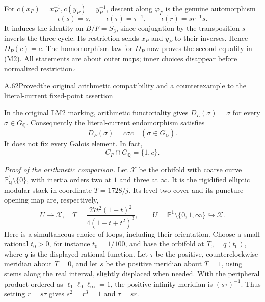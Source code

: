 For $c(x_P)=x_P^{-1},c(y_P)=y_P^{-1}$, descent along $\varphi_P$
is the genuine automorphism
\[
 \iota(s)=s,\qquad\iota(\tau)=\tau^{-1},\qquad
 \iota(r)=sr^{-1}s.
\]
It induces the identity on $B/F=S_3$, since conjugation by the
transposition $s$ inverts the three-cycle. Its restriction sends
$x_P$ and $y_P$ to their inverses. Hence $D_P(c)=c$.
The homomorphism law for $D_P$ now proves the second equality in (M2).
All statements are about outer maps; inner choices disappear before
normalized restriction.\hfill$\square$

\begin{statement}{A.62}{Proved}{the original arithmetic compatibility and a counterexample to the literal-current fixed-point assertion}
\citep{LitLochakSchneps1997}
\end{statement}
In the original LM2 marking, arithmetic functoriality gives
$D_L(\sigma)=\sigma$ for every $\sigma\in G_{\mathbb Q}$.
Consequently the literal-current endomorphism satisfies
\[
                   D_P(\sigma)=c\sigma c
                   \quad(\sigma\in G_{\mathbb Q}).              \tag{M3}
\]
It does not fix every Galois element. In fact,
\[
                  C_P\cap G_{\mathbb Q}=\{1,c\}.
\]

\emph{Proof of the arithmetic comparison.} Let $\mathcal X$ be the
orbifold with coarse curve $\mathbb P^1_{\mathbb Q}\setminus\{0\}$,
with inertia orders two at $1$ and three at $\infty$. It is the
rigidified elliptic modular stack in coordinate $T=1728/j$.
Its level-two cover and its puncture-opening map are, respectively,
\[
 U\longrightarrow\mathcal X,\quad
 T=\frac{27t^2(1-t)^2}{4(1-t+t^2)^3},
 \qquad
 U=\mathbb P^1\setminus\{0,1,\infty\}\hookrightarrow\mathcal X.
\]
Here is a simultaneous choice of loops, including their orientation.
Choose a small rational $t_0>0$, for instance $t_0=1/100$, and base
the orbifold at $T_0=q(t_0)$, where $q$ is the displayed rational
function. Let $\tau$ be the positive, counterclockwise meridian
about $T=0$, and let $s$ be the positive meridian about $T=1$,
using stems along the real interval, slightly displaced when needed.
With the peripheral product ordered as $\ell_1\ell_0\ell_\infty=1$,
the positive infinity meridian is $(s\tau)^{-1}$. Thus setting
$r=s\tau$ gives $s^2=r^3=1$ and $\tau=sr$.


